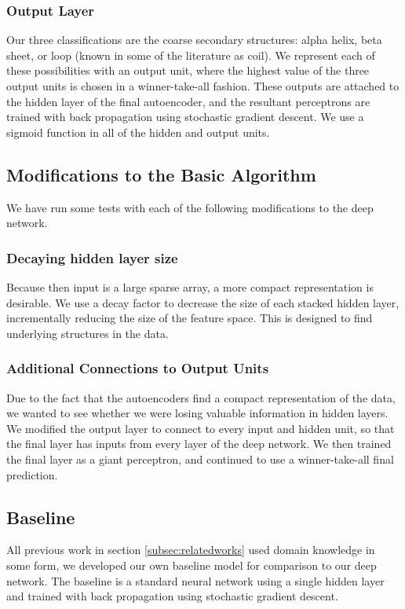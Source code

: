 \documentclass[]{article}
\begin{document}
\subsubsection{Output Layer}
Our three classifications are the coarse secondary structures: alpha helix, beta sheet, or loop (known in some of the literature as coil).
We represent each of these possibilities with an output unit, where the highest value of the three output units is chosen in a winner-take-all fashion.
These outputs are attached to the hidden layer of the final autoencoder, and the resultant perceptrons are trained with back propagation using stochastic gradient descent.
We use a sigmoid function in all of the hidden and output units.

\subsection{Modifications to the Basic Algorithm}
We have run some tests with each of the following modifications to the deep network.

\subsubsection{Decaying hidden layer size}
Because then input is a large sparse array, a more compact representation is desirable.
We use a decay factor to decrease the size of each stacked hidden layer, incrementally reducing the size of the feature space.
This is designed to find underlying structures in the data.

\subsubsection{Additional Connections to Output Units}
Due to the fact that the autoencoders find a compact representation of the data, we wanted to see whether we were losing valuable information in hidden layers.
We modified the output layer to connect to every input and hidden unit, so that the final layer has inputs from every layer of the deep network.
We then trained the final layer as a giant perceptron, and continued to use a winner-take-all final prediction.

\subsection{Baseline}
All previous work in section \ref{subsec:relatedworks} used domain knowledge in some form, we developed our own baseline model for comparison to our deep network.
The baseline is a standard neural network using a single hidden layer and trained with back propagation using stochastic gradient descent.
\end{document}

